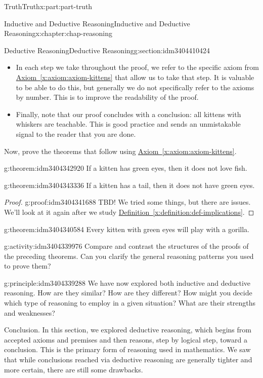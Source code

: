 \documentclass[oneside,10pt,]{book}
\newcommand{\xreffont}{\relax}
\numberwithin{equation}{section}
\begin{document}
\begin{partptx}{Truth}{}{Truth}{}{}{x:part:part-truth}
\begin{chapterptx}{Inductive and Deductive Reasoning}{}{Inductive and Deductive Reasoning}{}{}{x:chapter:chap-reasoning}
\begin{sectionptx}{Deductive Reasoning}{}{Deductive Reasoning}{}{}{g:section:idm3404410424}
\begin{itemize}[label=\textbullet]
\item{}In each step we take throughout the proof, we refer to the specific axiom from \hyperref[x:axiom:axiom-kittens]{Axiom~{\xreffont\ref{x:axiom:axiom-kittens}}} that allow us to take that step. It is valuable to be able to do this, but generally we do not specifically refer to the axioms by number. This is to improve the readability of the proof.%
\item{}Finally, note that our proof concludes with a conclusion: all kittens with whiskers are teachable. This is good practice and sends an unmistakable signal to the reader that you are done.%
\end{itemize}
Now, prove the theorems that follow using \hyperref[x:axiom:axiom-kittens]{Axiom~{\xreffont\ref{x:axiom:axiom-kittens}}}.%
\begin{theorem}{}{}{g:theorem:idm3404342920}%
If a kitten has green eyes, then it does not love fish.%
\end{theorem}
\begin{theorem}{}{}{g:theorem:idm3404343336}%
If a kitten has a tail, then it does not have green eyes.%
\end{theorem}
\begin{proof}{}{g:proof:idm3404341688}
TBD! We tried some things, but there are issues. We'll look at it again after we study \hyperref[x:definition:def-implications]{Definition~{\xreffont\ref{x:definition:def-implications}}}.%
\end{proof}
\begin{theorem}{}{}{g:theorem:idm3404340584}%
Every kitten with green eyes will play with a gorilla.%
\end{theorem}
\begin{activity}{}{g:activity:idm3404339976}%
Compare and contrast the structures of the proofs of the preceding theorems. Can you clarify the general reasoning patterns you used to prove them?%
\end{activity}%
\begin{principle}{}{}{g:principle:idm3404339288}%
We have now explored both inductive and deductive reasoning. How are they similar? How are they different? How might you decide which type of reasoning to employ in a given situation? What are their strengths and weaknesses?%
\end{principle}
\begin{conclusion}{Conclusion.}%
In this section, we explored deductive reasoning, which begins from accepted axioms and premises and then reasons, step by logical step, toward a conclusion. This is the primary form of reasoning used in mathematics. We saw that while conclusions reached via deductive reasoning are generally tighter and more certain, there are still some drawbacks.%

\end{conclusion}
\end{sectionptx}
\end{chapterptx}
\end{partptx}
\end{document}
